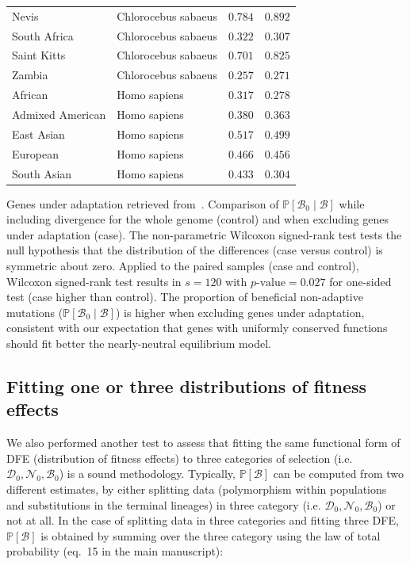 \documentclass{article}
\newcommand{\proba}{\mathbb{P}}
\newcommand{\SphyDel}{\mathcal{D}_0}
\newcommand{\SphyNeu}{\mathcal{N}_0}
\newcommand{\SphyBen}{\mathcal{B}_0}
\newcommand{\given}{\mid}
\newcommand{\SpopBen}{\mathcal{B}}
\newcommand{\pvalue}{p\text{-value}}
\begin{document}
\begin{center}
\begin{tabular}{|l|l|r|r|}
            \rowcolor{LIGHTGREY} Nevis & Chlorocebus sabaeus & $ 0.784$ & $ 0.892$ \\
            \rowcolor{LIGHTGREY} South Africa & Chlorocebus sabaeus & $ 0.322$ & $ 0.307$ \\
            \rowcolor{LIGHTGREY} Saint Kitts & Chlorocebus sabaeus & $ 0.701$ & $ 0.825$ \\
            \rowcolor{LIGHTGREY} Zambia & Chlorocebus sabaeus & $ 0.257$ & $ 0.271$ \\
            African & Homo sapiens & $ 0.317$ & $ 0.278$ \\
            Admixed American & Homo sapiens & $ 0.380$ & $ 0.363$ \\
            East Asian & Homo sapiens & $ 0.517$ & $ 0.499$ \\
            European & Homo sapiens & $ 0.466$ & $ 0.456$ \\
            South Asian & Homo sapiens & $ 0.433$ & $ 0.304$ \\
            \bottomrule
        \end{tabular}
    \end{center}
    Genes under adaptation retrieved from~\cite{latrille_genes_2023}.
    Comparison of $\proba[\SphyBen\given \SpopBen ]$ while including divergence for the whole genome (control) and when excluding genes under adaptation (case).
    The non-parametric Wilcoxon signed-rank test tests the null hypothesis that the distribution of the differences (case versus control) is symmetric about zero.
    Applied to the paired samples (case and control), Wilcoxon signed-rank test results in $s=120$ with $\pvalue=0.027$ for one-sided test (case higher than control).
    The proportion of beneficial non-adaptive mutations ($\proba[\SphyBen\given \SpopBen ]$) is higher when excluding genes under adaptation, consistent with our expectation that genes with uniformly conserved functions should fit better the nearly-neutral equilibrium model.

    \newpage
    \subsection{Fitting one or three distributions of fitness effects}

    We also performed another test to assess that fitting the same functional form of DFE (distribution of fitness effects) to three categories of selection (i.e. $\SphyDel, \SphyNeu, \SphyBen$) is a sound methodology.
    Typically, $\proba [ \SpopBen ]$ can be computed from two different estimates, by either splitting data (polymorphism within populations and substitutions in the terminal lineages) in three category (i.e. $\SphyDel, \SphyNeu, \SphyBen$) or not at all.
    In the case of splitting data in three categories and fitting three DFE, $\proba [ \SpopBen ]$ is obtained by summing over the three category using the law of total probability (eq.\ 15 in the main manuscript):
\end{document}
